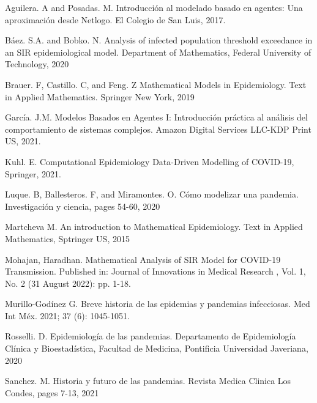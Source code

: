 \documentclass[a4paper,openany,12pt]{article}
\begin{document}
\begin{thebibliography}{5}

Aguilera. A and Posadas. M. Introducción al modelado basado en agentes: Una aproximación desde Netlogo. El Colegio de San Luis, 2017.

Báez. S.A. and Bobko. N. Analysis of infected population threshold exceedance in an SIR epidemiological model. Department of Mathematics, Federal University of Technology, 2020  

Brauer. F, Castillo. C, and Feng. Z Mathematical Models in Epidemiology. Text in Applied Mathematics. Springer New York, 2019

García. J.M. Modelos Basados en Agentes I: Introducción práctica al análisis del comportamiento de sistemas complejos. Amazon Digital Services LLC-KDP Print US, 2021.

\bibitem{}
Kuhl. E. Computational Epidemiology Data-Driven Modelling of COVID-19, Springer, 2021.

Luque. B, Ballesteros. F, and Miramontes. O. Cómo modelizar una pandemia. Investigación y ciencia, pages 54-60, 2020

Martcheva M. An introduction to Mathematical Epidemiology. Text in Applied Mathematics, Sptringer US, 2015 

Mohajan, Haradhan. Mathematical Analysis of SIR Model for COVID-19 Transmission. Published in: Journal of Innovations in Medical Research , Vol. 1, No. 2 (31 August 2022): pp. 1-18. 

Murillo-Godínez G. Breve historia de las epidemias y pandemias infecciosas. Med Int Méx. 2021; 37 (6): 1045-1051.

Rosselli. D. Epidemiología de las pandemias. Departamento de Epidemiología Clínica y Bioestadística, Facultad de Medicina, Pontificia Universidad Javeriana, 2020 

Sanchez. M. Historia y futuro de las pandemias. Revista Medica Clinica Los Condes, pages 7-13, 2021

\end{thebibliography}
\end{document}

